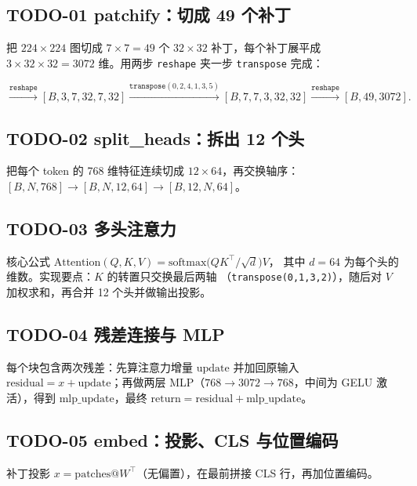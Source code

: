 \documentclass[11pt]{ctexart}
\begin{document}
\subsection{\textcolor{myred}{TODO-01} patchify：切成 49 个补丁}

把 $224\times224$ 图切成 $7\times7=49$ 个 $32\times32$ 补丁，每个补丁展平成
$3\times32\times32=3072$ 维。用两步 \texttt{reshape} 夹一步 \texttt{transpose} 完成：

\begin{equation*}
[B,3,224,224] \xrightarrow{\texttt{reshape}} [B,3,7,32,7,32]
\xrightarrow{\texttt{transpose}(0,2,4,1,3,5)} [B,7,7,3,32,32]
\xrightarrow{\texttt{reshape}} [B,49,3072].
\end{equation*}

\subsection{\textcolor{myred}{TODO-02} split\_heads：拆出 12 个头}

把每个 token 的 768 维特征连续切成 $12\times64$，再交换轴序：
$[B,N,768]\to[B,N,12,64]\to[B,12,N,64]$。

\subsection{\textcolor{myred}{TODO-03} 多头注意力}

核心公式 $\mathrm{Attention}(Q,K,V)=\mathrm{softmax}\!\big(QK^\top/\sqrt{d}\big)V$，
其中 $d=64$ 为每个头的维数。实现要点：$K$ 的转置只交换最后两轴
（\texttt{transpose(0,1,3,2)}），随后对 $V$ 加权求和，再合并 12 个头并做输出投影。

\subsection{\textcolor{myred}{TODO-04} 残差连接与 MLP}

每个块包含两次残差：先算注意力增量 $\mathrm{update}$ 并加回原输入
$\mathrm{residual}=x+\mathrm{update}$；再做两层 MLP（$768\to3072\to768$，中间为
GELU 激活），得到 $\mathrm{mlp\_update}$，最终 $\mathrm{return}=\mathrm{residual}+\mathrm{mlp\_update}$。

\subsection{\textcolor{myred}{TODO-05} embed：投影、CLS 与位置编码}

补丁投影 $x=\mathrm{patches}@W^\top$（无偏置），在最前拼接 CLS 行，再加位置编码。
\end{document}
